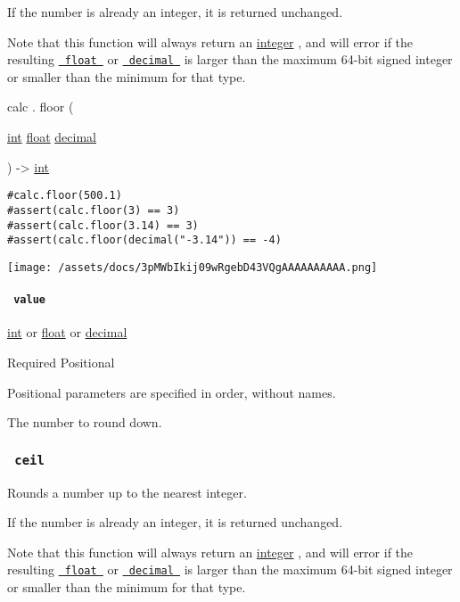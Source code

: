 If the number is already an integer, it is returned unchanged.

Note that this function will always return an
\href{/docs/reference/foundations/int/}{integer} , and will error if the
resulting \href{/docs/reference/foundations/float/}{\texttt{\ float\ }}
or \href{/docs/reference/foundations/decimal/}{\texttt{\ decimal\ }} is
larger than the maximum 64-bit signed integer or smaller than the
minimum for that type.

calc { . } { floor } (

{ \href{/docs/reference/foundations/int/}{int}
\href{/docs/reference/foundations/float/}{float}
\href{/docs/reference/foundations/decimal/}{decimal} }

) -\textgreater{} \href{/docs/reference/foundations/int/}{int}

\begin{verbatim}
#calc.floor(500.1)
#assert(calc.floor(3) == 3)
#assert(calc.floor(3.14) == 3)
#assert(calc.floor(decimal("-3.14")) == -4)
\end{verbatim}

\texttt{[image: /assets/docs/3pMWbIkij09wRgebD43VQgAAAAAAAAAA.png]}

\paragraph{\texorpdfstring{\texttt{\ value\ }}{ value }}\label{functions-floor-value}

\href{/docs/reference/foundations/int/}{int} {or}
\href{/docs/reference/foundations/float/}{float} {or}
\href{/docs/reference/foundations/decimal/}{decimal}

{Required} {{ Positional }}

\label{functions-floor-value-positional-tooltip}
Positional parameters are specified in order, without names.

The number to round down.

\subsubsection{\texorpdfstring{\texttt{\ ceil\ }}{ ceil }}\label{functions-ceil}

Rounds a number up to the nearest integer.

If the number is already an integer, it is returned unchanged.

Note that this function will always return an
\href{/docs/reference/foundations/int/}{integer} , and will error if the
resulting \href{/docs/reference/foundations/float/}{\texttt{\ float\ }}
or \href{/docs/reference/foundations/decimal/}{\texttt{\ decimal\ }} is
larger than the maximum 64-bit signed integer or smaller than the
minimum for that type.

